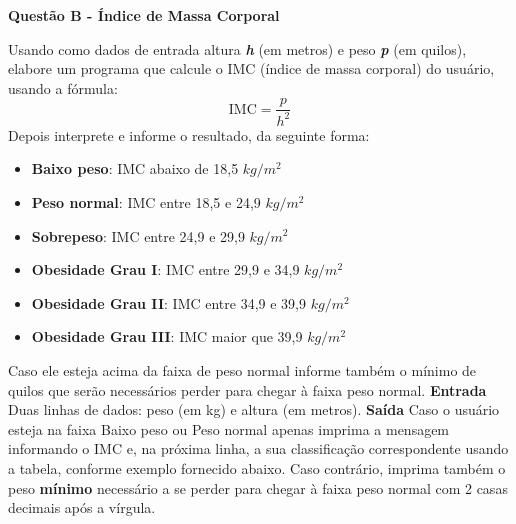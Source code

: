 \documentclass[a4paper, 12pt]{article}
\begin{document}
\newpage %
\begin{center}
\textbf{{\Large Questão B - Índice de Massa Corporal}}
\end{center}
\vspace{5pt}
Usando como dados de entrada altura \textbf{\textit{h}} (em metros) e peso \textit{\textbf{p}} (em quilos), elabore um programa que calcule o IMC (índice de massa corporal) do usuário, usando a fórmula:
$$ \textrm{IMC} = \dfrac{p}{h^2} $$
Depois interprete e informe o resultado, da seguinte forma: 
\begin{itemize}
	\item \textbf{Baixo peso}: IMC abaixo de 18,5 $kg/m^2$
	\item \textbf{Peso normal}: IMC entre 18,5 e 24,9 $kg/m^2$
	\item \textbf{Sobrepeso}: IMC entre 24,9 e 29,9 $kg/m^2$
	\item \textbf{Obesidade Grau I}: IMC entre 29,9 e 34,9 $kg/m^2$
	\item \textbf{Obesidade Grau II}: IMC entre 34,9 e 39,9 $kg/m^2$
	\item \textbf{Obesidade Grau III}: IMC maior que 39,9 $kg/m^2$
\end{itemize}
Caso ele esteja acima da faixa de peso normal informe também o mínimo de quilos que serão necessários perder para chegar à faixa peso normal. 
\newline \newline
\textbf{{\large Entrada}} \newline
Duas linhas de dados: peso (em kg) e altura (em metros).
\newline \newline
\textbf{{\large Saída}} \newline
Caso o usuário esteja na faixa Baixo peso ou Peso normal apenas imprima a mensagem informando o IMC e, na próxima linha, a sua classificação correspondente usando a tabela, conforme exemplo fornecido abaixo. Caso contrário, imprima também o peso \textbf{mínimo} necessário a se perder para chegar à faixa peso normal com 2 casas decimais após a vírgula.
\newline
\end{document}
